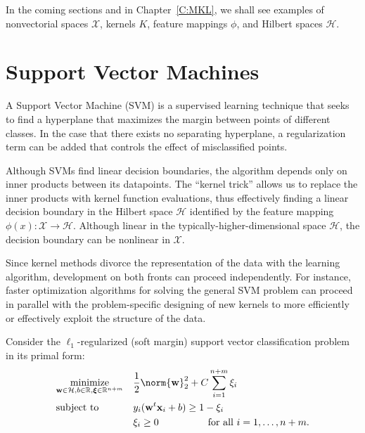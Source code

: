 In the coming sections and in Chapter~\ref{C:MKL}, we shall see examples of
nonvectorial spaces $\mathcal{X}$, kernels $K$, feature mappings $\phi$, and
Hilbert spaces $\mathcal{H}$.

\section{Support Vector Machines}
\label{S:SVM-section}
A Support Vector Machine (SVM) \cite{cortes1995support} is a supervised learning
technique that seeks to find a hyperplane that maximizes the margin between
points of different classes.  In the case that there exists no separating
hyperplane, a regularization term can be added that controls the effect of
misclassified points.

Although SVMs find linear decision boundaries,
the algorithm depends only on inner products between its datapoints.  The
``kernel trick'' \cite{aizerman1964theoretical} allows us to replace the
inner products with kernel function evaluations, thus effectively finding
a linear decision boundary in the Hilbert space $\mathcal{H}$ identified by
the feature mapping $\phi(x): \mathcal{X} \to \mathcal{H}$.  Although linear
in the typically-higher-dimensional space $\mathcal{H}$, the decision boundary
can be nonlinear in $\mathcal{X}$.

Since kernel methods divorce the representation of the data with the learning
algorithm, development on both fronts can proceed independently.  For instance,
faster optimization algorithms for solving the general SVM problem can proceed
in parallel with the problem-specific designing of new kernels to more efficiently
or effectively exploit the structure of the data.

Consider the $\ell_1$-regularized (soft margin) support vector classification
problem \cite{scholkopf2002learning} in its primal form:
\begin{equation}
\label{eq:l1-svm-primal}
\begin{aligned}
& \underset{\mathbf{w} \in \mathcal{H}, b \in \mathbb{R}, {\boldsymbol \xi} \in \mathbb{R}^{n+m}}{\text{minimize}}
& &\frac{1}{2}\norm{\mathbf{w}}_2^2+C\sum_{i=1}^{n+m} \xi_i \\
& \text{subject to}
& & y_i(\mathbf{w}^t \mathbf{x}_i + b) \geq 1 - \xi_i \\
&&& \xi_i \geq 0 \qquad \qquad \quad \text{for all } i=1,\ldots,n+m.
\end{aligned}
\end{equation}

